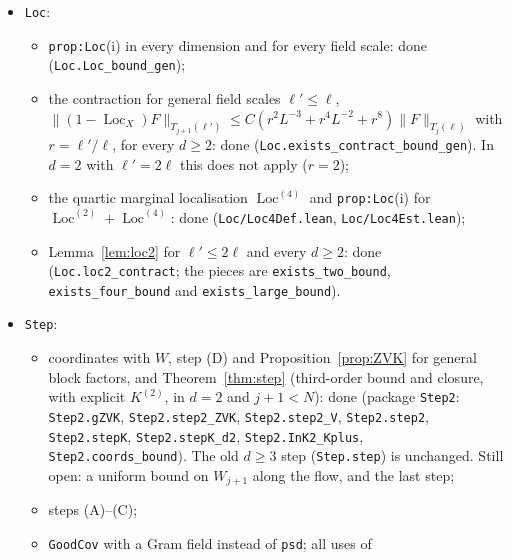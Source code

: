 \documentclass[11pt]{amsart}
\theoremstyle{definition}
\theoremstyle{remark}
\numberwithin{equation}{section}
\newcommand{\Loc}{\operatorname{Loc}}
\begin{document}
\begin{itemize}
\begin{itemize}
    \texttt{DressedFRD.Tj\_ECC\_theta\_le\_of\_snorm});
  \item Lemma~\ref{lem:pauli}, replacing \texttt{Tj\_succ\_le} and
    \texttt{Tj\_EC\_theta\_le} (which assume $d\ge3$): done (\texttt{Loc/Pauli*.lean}:
    \texttt{Loc.pauli\_abstract} for abstract partitions of unity, \texttt{Loc.pauli} on the
    torus with the B-spline partition, \texttt{Loc.card\_nearB\_le},
    \texttt{Loc.pauli\_EC} for the Gaussian expectation).
  \end{itemize}
\item \texttt{Loc}:
  \begin{itemize}
  \item \texttt{prop:Loc}(i) in every dimension and for every field scale: done
    (\texttt{Loc.Loc\_bound\_gen});
  \item the contraction for general field scales $\ell'\le\ell$,
    $\|(1-\Loc_X)F\|_{T_{j+1}(\ell')}\le C(r^2L^{-3}+r^4L^{-2}+r^8)\|F\|_{T_j(\ell)}$ with
    $r=\ell'/\ell$, for every $d\ge2$: done (\texttt{Loc.exists\_contract\_bound\_gen}). In
    $d=2$ with $\ell'=2\ell$ this does not apply ($r=2$);
  \item the quartic marginal localisation $\Loc^{(4)}$ and \texttt{prop:Loc}(i) for
    $\Loc^{(2)}+\Loc^{(4)}$: done (\texttt{Loc/Loc4Def.lean}, \texttt{Loc/Loc4Est.lean});
  \item Lemma~\ref{lem:loc2} for $\ell'\le2\ell$ and every $d\ge2$: done
    (\texttt{Loc.loc2\_contract}; the pieces are \texttt{exists\_two\_bound},
    \texttt{exists\_four\_bound} and \texttt{exists\_large\_bound}).
  \end{itemize}
\item \texttt{Step}:
  \begin{itemize}
  \item coordinates with $W$, step (D) and Proposition~\ref{prop:ZVK} for general block
    factors, and Theorem~\ref{thm:step} (third-order bound and closure, with explicit
    $K^{(2)}$, in $d=2$ and $j+1<N$): done (package \texttt{Step2}: \texttt{Step2.gZVK},
    \texttt{Step2.step2\_ZVK}, \texttt{Step2.step2\_V}, \texttt{Step2.step2},
    \texttt{Step2.stepK}, \texttt{Step2.stepK\_d2}, \texttt{Step2.InK2\_Kplus},
    \texttt{Step2.coords\_bound}). The old $d\ge3$ step (\texttt{Step.step}) is unchanged. Still
    open: a uniform bound on $W_{j+1}$ along the flow, and the last step;
  \item steps (A)--(C);
  \item \texttt{GoodCov} with a Gram field instead of \texttt{psd}; all uses of

\end{itemize}
\end{itemize}
\end{document}
